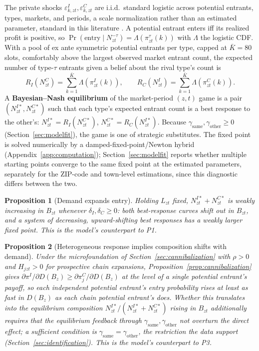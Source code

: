 \documentclass[english,12pt]{article}
\newtheorem{proposition}{Proposition}
\begin{document}
The private shocks $\varepsilon^I_{k,zt}, \varepsilon^C_{k,zt}$ are i.i.d.\ standard logistic across potential entrants, types, markets, and periods, a scale normalization rather than an estimated parameter, standard in this literature \citep{Seim2006,TrainDCM}. A potential entrant enters iff its realized profit is positive, so $\Pr(\text{entry}\mid N^{-\tau}_{zt}) = \Lambda(\pi^\tau_{zt}(k))$ with $\Lambda$ the logistic CDF. With a pool of ex ante symmetric potential entrants per type, capped at $\bar K=80$ slots, comfortably above the largest observed market entrant count, the expected number of type-$\tau$ entrants given a belief about the rival type's count is
\[
R_I(N^C_{zt}) = \sum_{k=1}^{\bar K}\Lambda(\pi^I_{zt}(k)), \qquad R_C(N^I_{zt}) = \sum_{k=1}^{\bar K}\Lambda(\pi^C_{zt}(k)).
\]
A \textbf{Bayesian--Nash equilibrium} of the market-period $(z,t)$ game is a pair $(N^{I*}_{zt}, N^{C*}_{zt})$ such that each type's expected entrant count is a best response to the other's: $N^{I*}_{zt}=R_I(N^{C*}_{zt})$, $N^{C*}_{zt}=R_C(N^{I*}_{zt})$. Because $\gamma_{\text{same}},\gamma_{\text{other}}\ge0$ (Section~\ref{sec:modelfit}), the game is one of strategic substitutes. The fixed point is solved numerically by a damped-fixed-point/Newton hybrid (Appendix~\ref{app:computation}); Section~\ref{sec:modelfit} reports whether multiple starting points converge to the same fixed point at the estimated parameters, separately for the ZIP-code and town-level estimations, since this diagnostic differs between the two.

\begin{proposition}[Demand expands entry]
\label{prop:1}
Holding $L_{zt}$ fixed, $N^{I*}_{zt}+N^{C*}_{zt}$ is weakly increasing in $B_{zt}$ whenever $\delta_I,\delta_C\ge0$: both best-response curves shift out in $B_{zt}$, and a system of decreasing, upward-shifting best responses has a weakly larger fixed point. This is the model's counterpart to P1.
\end{proposition}

\begin{proposition}[Heterogeneous response implies composition shifts with demand]
\label{prop:2}
Under the microfoundation of Section~\ref{sec:cannibalization} with $\rho>0$ and $H_{jzt}>0$ for prospective chain expansions, Proposition~\ref{prop:cannibalization} gives $\partial\pi^I/\partial D(B_z)\ge\partial\pi^C_j/\partial D(B_z)$ at the level of a single potential entrant's payoff, so each independent potential entrant's entry probability rises at least as fast in $D(B_z)$ as each chain potential entrant's does. Whether this translates into the \emph{equilibrium} composition $N^{I*}_{zt}/(N^{I*}_{zt}+N^{C*}_{zt})$ rising in $B_{zt}$ additionally requires that the equilibrium feedback through $\gamma_{\text{same}},\gamma_{\text{other}}$ not overturn the direct effect; a sufficient condition is $\gamma_{\text{same}}=\gamma_{\text{other}}$, the restriction the data support (Section~\ref{sec:identification}). This is the model's counterpart to P3.
\end{proposition}
\end{document}
